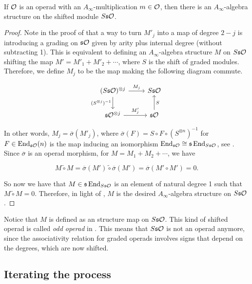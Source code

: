 \documentclass[Thesis.tex]{subfiles}
\begin{document}
\begin{propo}\label{ainftystructure}
If ${\mathcal O}$ is an operad with an $A_\infty$-multiplication $m\in{\mathcal O}$, then there is an $A_\infty$-algebra structure on the shifted module $S\mathfrak{s}{\mathcal O}$. 
\end{propo}
\begin{proof}
Note in the proof of  that a way to turn $M'_j$ into a map of degree $2-j$ is introducing a grading on $\mathfrak{s}{\mathcal O}$ given by arity plus internal degree (without subtracting 1). This is equivalent to defining an $A_\infty$-algebra structure $M$ on $S\mathfrak{s}{\mathcal O}$ shifting the map $M'=M'_1+M'_2+\cdots$, where $S$ is the shift of graded modules. Therefore, we define $M_j$ to be the map making the following diagram commute.

\[
\begin{tikzcd}
(S\s\OO)^{\otimes j}\arrow[r,"M_j"]\arrow[d, "(S^{\otimes j})^{-1}"'] & S\s\OO\\
\s\OO^{\otimes j}\arrow[r, "M'_j"] & \s\OO\arrow[u,"S"']
\end{tikzcd}
\]

In other words, $M_j=\overline{\sigma}(M'_j)$, where $\overline{\sigma}(F)=S\circ F\circ (S^{\otimes n})^{-1}$ for $F\in\operatorname{End}_{\mathfrak{s}{\mathcal O}}(n)$ is the map inducing an isomorphism $\operatorname{End}_{\mathfrak{s}{\mathcal O}}\cong \mathfrak{s}\operatorname{End}_{S\mathfrak{s}{\mathcal O}}$, see . Since $\overline{\sigma}$ is an operad morphism, for $M=M_1+M_2+\cdots$, we have

\[
M\tilde{\circ}M=\overline{\sigma}(M')\tilde{\circ}\overline{\sigma}(M')=\overline{\sigma}(M'\circ M')=0.
\]

So now we have that $M\in\mathfrak{s}\operatorname{End}_{S\mathfrak{s}{\mathcal O}}$ is an element of natural degree 1 such that $M\tilde\circ M=0$. Therefore, in light of , $M$ is the desired $A_\infty$-algebra structure on $S\mathfrak{s}{\mathcal O}$. 
\end{proof}
Notice that $M$ is defined as an structure map on $S\mathfrak{s}{\mathcal O}$. This kind of shifted operad is called \emph{odd operad} in \cite{ward}. This means that $S\mathfrak{s}{\mathcal O}$ is not an operad anymore, since the associativity relation for graded operads involves signs that depend on the degrees, which are now shifted. 

\subsection{Iterating the process}\label{sect3}
\end{document}
